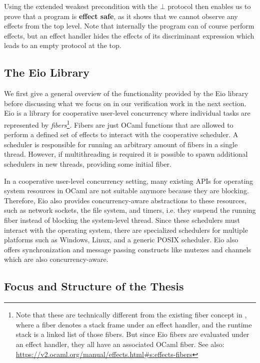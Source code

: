 Using the extended weakest precondition with the \(\bot\) protocol then enables us to prove that a program is \textbf{effect safe}, as it shows that we cannot observe any effects from the top level.
Note that internally the program can of course perform effects, but an effect handler hides the effects of its discriminant expression which leads to an empty protocol at the top.

\subsection{The Eio Library}
\label{sec:intro-eio}

We first give a general overview of the functionality provided by the Eio library before discussing what we focus on in our verification work in the next section.
Eio is a library for cooperative user-level concurrency where individual tasks are represented by \emph{fibers}\footnote{Note that these are technically different from the existing fiber concept in \ocf{}, where a fiber denotes a stack frame under an effect handler, and the runtime stack is a linked list of those fibers. But since Eio fibers are evaluated under an effect handler, they all have an associated OCaml fiber. See also: \url{https://v2.ocaml.org/manual/effects.html\#s:effects-fibers}}.
Fibers are just OCaml functions that are allowed to perform a defined set of effects to interact with the cooperative scheduler.
A scheduler is responsible for running an arbitrary amount of fibers in a single thread.
However, if multithreading is required it is possible to spawn additional schedulers in new threads, providing some initial fiber.

In a cooperative user-level concurrency setting, many existing APIs for operating system resources in OCaml are not suitable anymore because they are blocking.
Therefore, Eio also provides concurrency-aware abstractions to these resources, such as network sockets, the file system, and timers, i.e. they suspend the running fiber instead of blocking the system-level thread.
Since these schedulers must interact with the operating system, there are specialized schedulers for multiple platforms such as Windows, Linux, and a generic POSIX scheduler.
Eio also offers synchronization and message passing constructs like mutexes and channels which are also concurrency-aware.

\subsection{Focus and Structure of the Thesis}
\label{sec:intro-structure}

